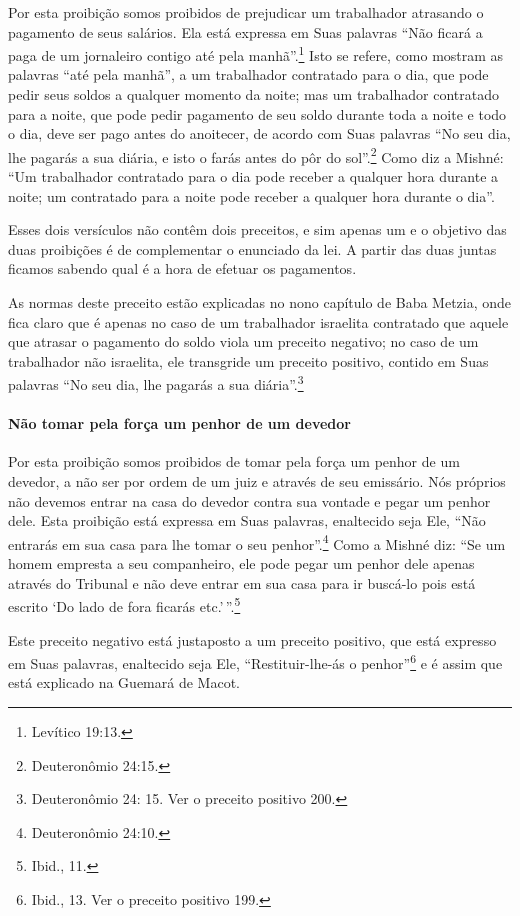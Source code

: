 Por esta proibição somos proibidos de prejudicar um trabalhador
atrasando o pagamento de seus salários. Ela está expressa em Suas
palavras ``Não ficará a paga de um jornaleiro contigo até pela manhã''.\footnote{Levítico 19:13.} Isto se refere, como mostram as palavras ``até pela
manhã'', a um trabalhador contratado para o dia, que pode pedir seus
soldos a qualquer momento da noite; mas um trabalhador contratado para a
noite, que pode pedir pagamento de seu soldo durante toda a noite e todo
o dia, deve ser pago antes do anoitecer, de acordo com Suas palavras
``No seu dia, lhe pagarás a sua diária, e isto o farás antes do pôr do
sol''.\footnote{Deuteronômio 24:15.} Como diz a Mishné: ``Um trabalhador
contratado para o dia pode receber a qualquer hora durante a noite; um
contratado para a noite pode receber a qualquer hora durante o dia''.

Esses dois versículos não contêm dois preceitos, e sim apenas um e o
objetivo das duas proibições é de complementar o enunciado da lei. A
partir das duas juntas ficamos sabendo qual é a hora de efetuar os
pagamentos.

As normas deste preceito estão explicadas no nono capítulo de Baba
Metzia, onde fica claro que é apenas no caso de um trabalhador israelita
contratado que aquele que atrasar o pagamento do soldo viola um
preceito negativo; no caso de um trabalhador não israelita, ele
transgride um preceito positivo, contido em Suas palavras ``No seu dia,
lhe pagarás a sua diária''.\footnote{Deuteronômio 24: 15. Ver o preceito positivo 200.}

\paragraph{Não tomar pela força um penhor de um devedor}

Por esta proibição somos proibidos de tomar pela força um penhor de um
devedor, a não ser por ordem de um juiz e através de seu emissário. Nós
próprios não devemos entrar na casa do devedor contra sua vontade e
pegar um penhor dele. Esta proibição está expressa em Suas palavras,
enaltecido seja Ele, ``Não entrarás em sua casa para lhe tomar o seu
penhor''.\footnote{Deuteronômio 24:10.} Como a Mishné diz: ``Se um homem
empresta a seu companheiro, ele pode pegar um penhor dele apenas através
do Tribunal e não deve entrar em sua casa para ir buscá-lo pois está
escrito `Do lado de fora ficarás etc.'\,''.\footnote{Ibid., 11.}

Este preceito negativo está justaposto a um preceito positivo, que está
expresso em Suas palavras, enaltecido seja Ele, ``Restituir-lhe-ás o
penhor''\footnote{Ibid., 13. Ver o preceito positivo 199.} e é assim que está explicado
na Guemará de Macot.


